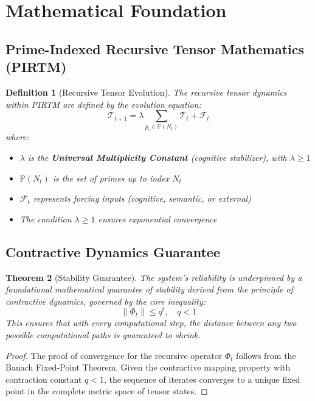\documentclass[11pt,a4paper]{article}
\newtheorem{theorem}{Theorem}[section]
\newtheorem{definition}[theorem]{Definition}
\newcommand{\Tensor}[1]{\mathcal{T}_{#1}}
\newcommand{\PrimeSet}[1]{\mathbb{P}(N_{#1})}
\begin{document}
\section{Mathematical Foundation}

\subsection{Prime-Indexed Recursive Tensor Mathematics (PIRTM)}

\begin{definition}[Recursive Tensor Evolution]
The recursive tensor dynamics within PIRTM are defined by the evolution equation:
\begin{equation}
    \Tensor{t+1} = \lambda \sum_{p_i \in \PrimeSet{t}} \Tensor{t} + \mathcal{F}_t
    \label{eq:tensor_evolution}
\end{equation}
where:
\begin{itemize}[noitemsep]
    \item $\lambda$ is the \textbf{Universal Multiplicity Constant} (cognitive stabilizer), with $\lambda \geq 1$
    \item $\PrimeSet{t}$ is the set of primes up to index $N_t$
    \item $\mathcal{F}_t$ represents forcing inputs (cognitive, semantic, or external)
    \item The condition $\lambda \geq 1$ ensures exponential convergence
\end{itemize}
\end{definition}

\subsection{Contractive Dynamics Guarantee}

\begin{theorem}[Stability Guarantee]
The system's reliability is underpinned by a foundational mathematical guarantee of stability derived from the principle of contractive dynamics, governed by the core inequality:
\begin{equation}
    \|\Phi_t\| \leq q^t, \quad q < 1
    \label{eq:contractive}
\end{equation}
This ensures that with every computational step, the distance between any two possible computational paths is guaranteed to shrink.
\end{theorem}

\begin{proof}
The proof of convergence for the recursive operator $\Phi_t$ follows from the Banach Fixed-Point Theorem. Given the contractive mapping property with contraction constant $q < 1$, the sequence of iterates converges to a unique fixed point in the complete metric space of tensor states.
\end{proof}
\end{document}
